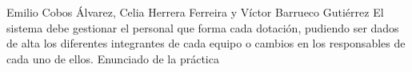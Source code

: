 {Emilio Cobos Álvarez, Celia Herrera Ferreira y Víctor Barrueco Gutiérrez}
{El sistema debe gestionar el personal que forma cada dotación, pudiendo ser dados de alta los diferentes integrantes de cada equipo o cambios en los responsables de cada uno de ellos.}
{Enunciado de la práctica}
